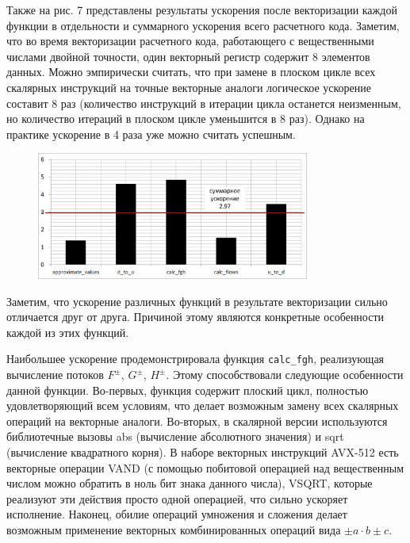 Также на рис. 7 представлены результаты ускорения после векторизации каждой функции в отдельности и суммарного ускорения всего расчетного кода.
Заметим, что во время векторизации расчетного кода, работающего с вещественными числами двойной точности, один векторный регистр содержит 8 элементов данных.
Можно эмпирически считать, что при замене в плоском цикле всех скалярных инструкций на точные векторные аналоги логическое ускорение составит 8 раз (количество инструкций в итерации цикла останется неизменным, но количество итераций в плоском цикле уменьшится в 8 раз). Однако на практике ускорение в 4 раза уже можно считать успешным.

\begin{figure}[ht]
	\centering
	\includegraphics[width=0.8\textwidth]{./pics/text_4_ibm/diagr2.png}
	\caption{}
	\label{fig:text_4_ibm_diagr2}
\end{figure}

Заметим, что ускорение различных функций в результате векторизации сильно отличается друг от друга.
Причиной этому являются конкретные особенности каждой из этих функций.

Наибольшее ускорение продемонстрировала функция \texttt{calc\_fgh}, реализующая вычисление потоков $F^{\pm}$, $G^{\pm}$, $H^{\pm}$.
Этому способствовали следующие особенности данной функции.
Во-первых, функция содержит плоский цикл, полностью удовлетворяющий всем условиям, что делает возможным замену всех скалярных операций на векторные аналоги.
Во-вторых, в скалярной версии используются библиотечные вызовы abs (вычисление абсолютного значения) и sqrt (вычисление квадратного корня).
В наборе векторных инструкций AVX-512 есть векторные операции VAND (с помощью побитовой операцией над вещественным числом можно обратить в ноль бит знака данного числа), VSQRT, которые реализуют эти действия просто одной операцией, что сильно ускоряет исполнение.
Наконец, обилие операций умножения и сложения делает возможным применение векторных комбинированных операций вида $\pm a \cdot b \pm c$.

